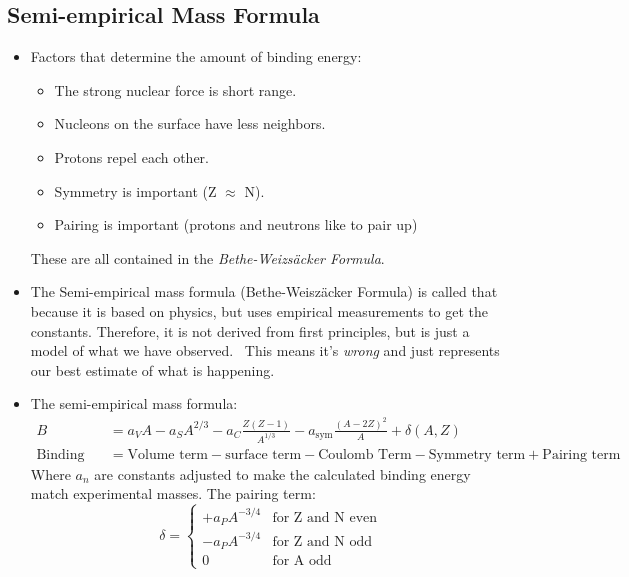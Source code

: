 \documentclass[letter]{article}
\begin{document}
\subsection{Semi-empirical Mass Formula}
\begin{itemize}
\item Factors that determine the amount of binding energy:
  \begin{itemize}
  \item The strong nuclear force is short range.
  \item Nucleons on the surface have less neighbors.
  \item Protons repel each other.
  \item Symmetry is important (Z $\approx$ N).
  \item Pairing is important (protons and neutrons like to pair up)
  \end{itemize}
These are all contained in the \textit{Bethe-Weizs\"acker
  Formula}.~\cite[Lec 3]{lecture}
\item The Semi-empirical mass formula (Bethe-Weisz\"acker Formula) is
  called that because it is based on physics, but uses empirical
  measurements to get the constants. Therefore, it is not derived from
  first principles, but is just a model of what we have
  observed.~\cite[Lec 3]{krane} This means it's \textit{wrong} and
  just represents our best estimate of what is happening.
\item The semi-empirical mass formula:
  \begin{equation*}
    \begin{split}
      B &= a_VA-
      a_SA^{2/3}-a_C\frac{Z(Z-1)}{A^{1/3}}-a_{\text{sym}}\frac{{(A-2Z)}^2}{A}
      + \delta{}(A,Z) \\
      \text{Binding Energy} &=  \text{Volume term} -  \text{surface
        term} -  \text{Coulomb Term} -  \text{Symmetry term} +
      \text{Pairing term}
    \end{split}
  \end{equation*}
Where $a_n$ are constants adjusted to make the calculated binding
energy match experimental masses. The pairing term:
\begin{equation*}
  \delta = 
  \begin{cases}
    +a_PA^{-3/4} & \text{for Z and N even} \\
    -a_PA^{-3/4} & \text{for Z and N odd} \\
    0 & \text{for A odd}
  \end{cases}
\end{equation*}


\end{itemize}
\end{document}
